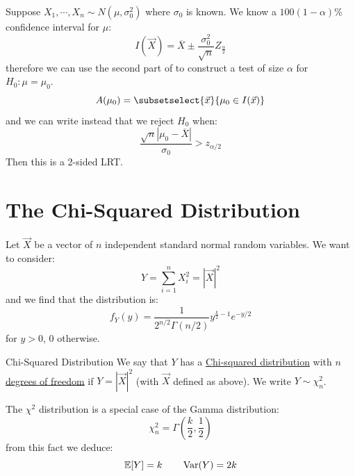 \documentclass[../Main.tex]{subfiles}
\begin{document}
\begin{example}
    Suppose $X_1, \cdots, X_n \sim N(\mu, \sigma_0^2)$ where $\sigma_0$ is known. We know a $100(1-\alpha)\%$ confidence interval for $\mu$:
    \begin{equation*}
        I(\vec{X}) = \overline{X} \pm \frac{\sigma_0^2}{\sqrt{n}} Z_{\frac{\alpha}{2}}
    \end{equation*}
    therefore we can use the second part of  to construct a test of size $\alpha$ for $H_0: \mu = \mu_0$.
    \begin{equation*}
        A(\mu_0) = \subsetselect{\vec{x}}{\mu_0 \in I(\vec{x})}
    \end{equation*}
    and we can write instead that we reject $H_0$ when:
    \begin{equation*}
        \frac{\sqrt{n}|\mu_0-\overline{X}|}{\sigma_0} > z_{\alpha / 2}
    \end{equation*}
    Then this is a 2-sided LRT.
\end{example}
\section{The Chi-Squared Distribution}
Let $\vec{X}$ be a vector of $n$ independent standard normal random variables. We want to consider:
\begin{equation*}
    Y = \sum_{i=1}^{n} X_i^2 = |\vec{X}|^2
\end{equation*}
and we find that the distribution is:
\begin{equation*}
    f_Y(y) = \frac{1}{2^{n/2} \Gamma(n / 2)} y^{\frac{k}{2} - 1} e^{-y / 2}
\end{equation*}
for $y > 0$, $0$ otherwise.

\begin{definition}{Chi-Squared Distribution}
    We say that $Y$ has a \underline{Chi-squared distribution} with $n$ \underline{degrees of freedom} if $Y = |\vec{X}|^2$ (with $\vec{X}$ defined as above). We write $Y \sim \chi_n^2$.
\end{definition}
The $\chi^2$ distribution is a special case of the Gamma distribution:
\begin{equation*}
    \chi_n^2 = \Gamma\left(\frac{k}{2}, \frac12\right)
\end{equation*}
from this fact we deduce:
\begin{equation*}
    \mathbb{E}[Y] = k \qquad \operatorname{Var}(Y) = 2k
\end{equation*}
\end{document}
